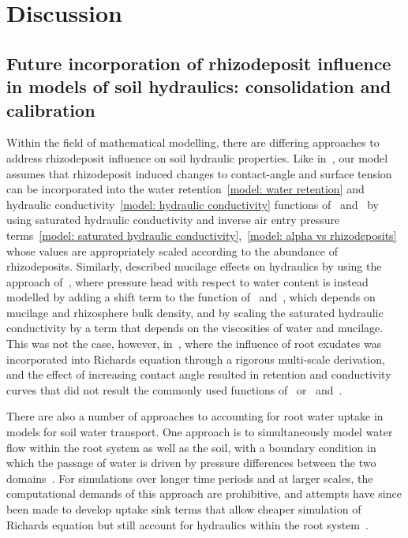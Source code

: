\documentclass[11pt,a4paper]{article}
\numberwithin{equation}{section}
\begin{document}
\section{Discussion}

\subsection{Future incorporation of rhizodeposit influence in models of soil hydraulics: consolidation and calibration}
Within the field of mathematical modelling, there are differing approaches to address rhizodeposit influence on soil hydraulic properties. Like in~\citep{vogel1996hydrus, karagunduz2001influence}, our model assumes that rhizodeposit induced changes to contact-angle and surface tension can be incorporated into the water retention~\eqref{model: water retention} and hydraulic conductivity~\eqref{model: hydraulic conductivity} functions of~\cite{mualem1976new} and~\cite{van1980closed} by using saturated hydraulic conductivity and inverse air entry pressure terms~\eqref{model: saturated hydraulic conductivity},~\eqref{model: alpha vs rhizodeposits} whose values are appropriately scaled according to the abundance of rhizodeposits. Similarly, \cite{landl2021modeling} described mucilage effects on hydraulics by using the approach of~\cite{kroener2014nonequilibrium}, where pressure head with respect to water content is instead modelled by adding a shift term to the function of~\cite{mualem1976new} and~\cite{van1980closed}, which depends on mucilage and rhizosphere bulk density, and by scaling the saturated hydraulic conductivity by a term that depends on the viscosities of water and mucilage. This was not the case, however, in~\citep{cooper2017fluid, cooper2018effect}, where the influence of root exudates was incorporated into Richards equation through a rigorous multi-scale derivation, and the effect of increasing contact angle resulted in retention and conductivity curves that did not result the commonly used functions of~\cite{brooks1964hydrau} or~\cite{mualem1976new} and~\cite{van1980closed}. 

There are also a number of approaches to accounting for root water uptake in models for soil water transport. One approach is to simultaneously model water flow within the root system as well as the soil, with a boundary condition in which the passage of water is driven by pressure differences between the two domains~\citep{gardner1991modeling, javaux2008use}. For simulations over longer time periods and at larger scales, the computational demands of this approach are prohibitive, and attempts have since been made to develop uptake sink terms that allow cheaper simulation of Richards equation but still account for hydraulics within the root system~\citep{couvreur2012simple}. 
\end{document}
